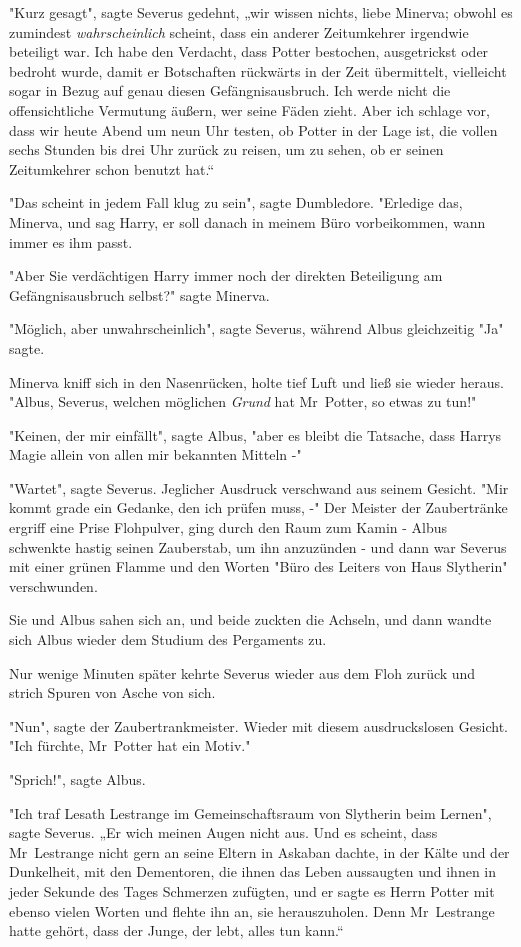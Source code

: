 {"Kurz gesagt", sagte Severus gedehnt, „wir wissen nichts, liebe Minerva; obwohl es zumindest \emph{wahrscheinlich} scheint, dass ein anderer Zeitumkehrer irgendwie beteiligt war. Ich habe den Verdacht, dass Potter bestochen, ausgetrickst oder bedroht wurde, damit er Botschaften rückwärts in der Zeit übermittelt, vielleicht sogar in Bezug auf genau diesen Gefängnisausbruch. Ich werde nicht die offensichtliche Vermutung äußern, wer seine Fäden zieht. Aber ich schlage vor, dass wir heute Abend um neun Uhr testen, ob Potter in der Lage ist, die vollen sechs Stunden bis drei Uhr zurück zu reisen, um zu sehen, ob er seinen Zeitumkehrer schon benutzt hat.“

"Das scheint in jedem Fall klug zu sein", sagte Dumbledore. "Erledige das, Minerva, und sag Harry, er soll danach in meinem Büro vorbeikommen, wann immer es ihm passt.

"Aber Sie verdächtigen Harry immer noch der direkten Beteiligung am Gefängnisausbruch selbst?" sagte Minerva.

"Möglich, aber unwahrscheinlich", sagte Severus, während Albus gleichzeitig "Ja" sagte.

Minerva kniff sich in den Nasenrücken, holte tief Luft und ließ sie wieder heraus. "Albus, Severus, welchen möglichen \emph{Grund} hat Mr~Potter, so etwas zu tun!"

"Keinen, der mir einfällt", sagte Albus, "aber es bleibt die Tatsache, dass Harrys Magie allein von allen mir bekannten Mitteln -"

"Wartet", sagte Severus. Jeglicher Ausdruck verschwand aus seinem Gesicht. "Mir kommt grade ein Gedanke, den ich prüfen muss, -" Der Meister der Zaubertränke ergriff eine Prise Flohpulver, ging durch den Raum zum Kamin - Albus schwenkte hastig seinen Zauberstab, um ihn anzuzünden - und dann war Severus mit einer grünen Flamme und den Worten "Büro des Leiters von Haus Slytherin" verschwunden.

Sie und Albus sahen sich an, und beide zuckten die Achseln, und dann wandte sich Albus wieder dem Studium des Pergaments zu.

Nur wenige Minuten später kehrte Severus wieder aus dem Floh zurück und strich Spuren von Asche von sich.

"Nun", sagte der Zaubertrankmeister. Wieder mit diesem ausdruckslosen Gesicht. "Ich fürchte, Mr~Potter hat ein Motiv."

"Sprich!", sagte Albus.

"Ich traf Lesath Lestrange im Gemeinschaftsraum von Slytherin beim Lernen", sagte Severus. „Er wich meinen Augen nicht aus. Und es scheint, dass Mr~Lestrange nicht gern an seine Eltern in Askaban dachte, in der Kälte und der Dunkelheit, mit den Dementoren, die ihnen das Leben aussaugten und ihnen in jeder Sekunde des Tages Schmerzen zufügten, und er sagte es Herrn Potter mit ebenso vielen Worten und flehte ihn an, sie herauszuholen. Denn Mr~Lestrange hatte gehört, dass der Junge, der lebt, alles tun kann.“

}
